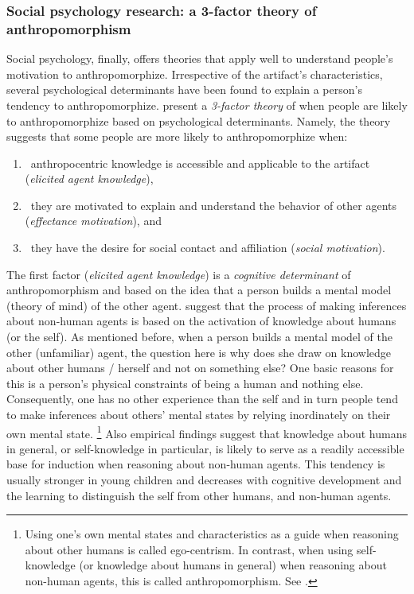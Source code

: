 \documentclass{frontiersSCNS} %
\begin{document}
\subsubsection{Social psychology research: a 3-factor theory of anthropomorphism\\}
\label{sec:psychological-factors}

Social psychology, finally, offers theories that apply well to understand
people's motivation to anthropomorphize. Irrespective of the artifact's
characteristics, several psychological determinants have been found to explain a
person's tendency to anthropomorphize. \cite{epley_seeing_2007} present a
\emph{3-factor theory} of when people are likely to anthropomorphize based on
psychological determinants. Namely, the theory suggests that some people are
more likely to anthropomorphize when: 

\begin{enumerate}

    \item ~anthropocentric knowledge is accessible and applicable to the
        artifact (\textit{elicited agent knowledge}),

    \item ~they are motivated to explain and understand the behavior of other
        agents (\textit{effectance motivation}), and

    \item ~they have the desire for social contact and affiliation
        (\textit{social motivation}).

\end{enumerate}

The first factor (\textit{elicited agent knowledge}) is a \emph{cognitive
determinant} of anthropomorphism and based on the idea that a person builds a
mental model (theory of mind) of the other agent. \citet{epley_seeing_2007}
suggest that the process of making inferences about non-human agents is based on
the activation of knowledge about humans (or the self). As mentioned before,
when a person builds a mental model of the other (unfamiliar) agent, the
question here is why does she draw on knowledge about other humans / herself and
not on something else? One basic reasons for this is a person's physical
constraints of being a human and nothing else. Consequently, one has no other
experience than the self and in turn people tend to make inferences about
others' mental states by relying inordinately on their own mental state.
\footnote{Using one's own mental states and characteristics as a guide when
reasoning about other humans is called ego-centrism. In contrast, when using
self-knowledge (or knowledge about humans in general) when reasoning about
non-human agents, this is called anthropomorphism. See
\cite{epley_seeing_2007}.} Also empirical findings suggest that knowledge about
humans in general, or self-knowledge in particular, is likely to serve as a
readily accessible base for induction when reasoning about non-human agents.
This tendency is usually stronger in young children and decreases with cognitive
development and the learning to distinguish the self from other humans, and
non-human agents. 
\end{document}
